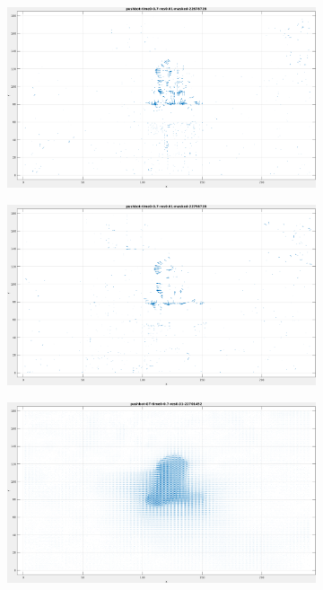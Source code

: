 \begin{appendix}
\begin{figure}[tb]
\begin{subfigure}{.45\textwidth}
  \includegraphics[height=.6\linewidth]{figs/pushbot/pushbot-masked-1.png}
  \caption{}
\end{subfigure}
\begin{subfigure}{.45\textwidth}
  \centering
  \includegraphics[height=.6\linewidth]{figs/pushbot/pushbot-masked-2.png}
  \caption{}
\end{subfigure}
\begin{subfigure}{.45\textwidth}
  \centering
  \includegraphics[height=.6\linewidth]{figs/pushbot/pushbot-GT-1.png}

\end{subfigure}
\end{figure}
\end{appendix}
